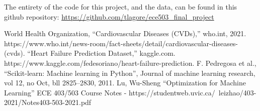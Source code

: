\documentclass[12pt,conference]{IEEEtran}
\begin{document}
The entirety of the code for this project, and the data, can be found in this github repository: \href{https://github.com/tlagore/ece503\_final\_project}{https://github.com/tlagore/ece503\_final\_project}

\begin{thebibliography}{00}
 World Health Organization, “Cardiovascular Diseases (CVDs),” who.int, 2021. https://www.who.int/news-room/fact-sheets/detail/cardiovascular-diseases-(cvds).
 “Heart Failure Prediction Dataset,” kaggle.com. https://www.kaggle.com/fedesoriano/heart-failure-prediction.
 F. Pedregosa et al., “Scikit-learn: Machine learning in Python”, Journal of machine learning research, vol 12, no Oct, bll 2825–2830, 2011.
Lu, Wu-Sheng “Optimization for Machine Learning” ECE 403/503 Course Notes - https://studentweb.uvic.ca/~leizhao/403-2021/Notes403-503-2021.pdf
\end{thebibliography}

\onecolumn
\end{document}

